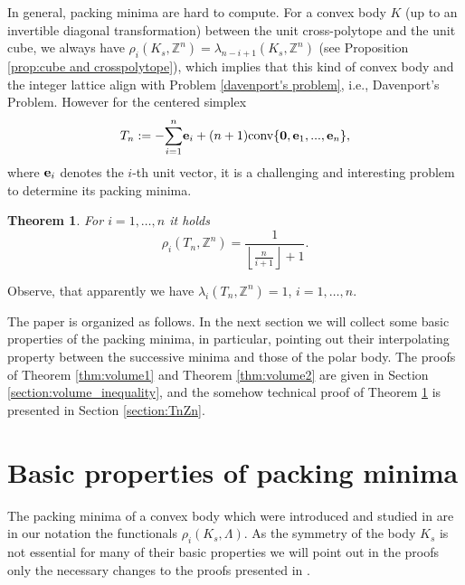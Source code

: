 \documentclass{amsart}
\newtheorem{theorem}{Theorem}[section]
\theoremstyle{definition}
\theoremstyle{remark}
\numberwithin{equation}{section}
\begin{document}
In general, packing  minima are hard to compute. For a convex body $K$ (up to an invertible diagonal transformation) between the unit cross-polytope and the unit cube, we always have $\rho_i(K_s,\mathbb{Z}^n)=\lambda_{n-i+1}(K_s,\mathbb{Z}^n)$ (see Proposition \ref{prop:cube and crosspolytope}), which implies that this kind of convex body and the integer lattice align with Problem \ref{davenport's problem}, i.e., Davenport's Problem. However for the centered simplex 
\begin{align*}
    T_n:=-\overset{n}{\underset{i=1}{\sum}}{\bf e}_i+(n+1)\mathrm{conv}\{{\bf 0},{\bf e}_1,...,{\bf e}_n\},
\end{align*} 
where ${\bf e}_i$ denotes the $i$-th unit vector, it is a challenging and interesting problem to determine its packing minima.

\begin{theorem}\label{thm:rhoiTnZn} For $i=1,\dots,n$ it holds 
    $${\rho}_i(T_n,\mathbb{Z}^n)=\frac{1}{\left\lfloor\frac{n}{i+1}\right\rfloor+1}.$$ 
\end{theorem}
Observe, that apparently we have  $\lambda_i(T_n,\mathbb{Z}^n)=1$, $i=1,\dots,n$.

The paper is organized as follows. In the next section we will collect some basic properties of the packing minima, in particular, pointing out their interpolating property between the successive minima and those of the polar body. The proofs of Theorem \ref{thm:volume1} and Theorem \ref{thm:volume2} are given in Section \ref{section:volume_inequality}, and the somehow technical proof of Theorem \ref{thm:rhoiTnZn} is presented in Section \ref{section:TnZn}. 








\section{\bf Basic properties of packing minima}\label{section:transference_bound}





The packing minima of a convex body which were introduced and studied in \cite{hsx2021} 
are in our notation the functionals $\rho_i(K_s,\Lambda)$. As the symmetry of the body $K_s$ is not essential 
for many of their basic properties we will point out in the proofs only the necessary changes to the proofs presented in \cite{hsx2021}.
\end{document}
